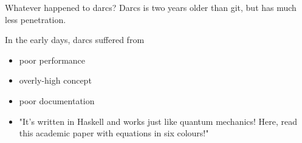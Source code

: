 \documentclass[pdf]{prosper}
\begin{document}

\begin{slide}{Whatever happened to darcs?}
Darcs is two years older than git, but has much less penetration.

In the early days, darcs suffered from
\begin{itemize}
\item poor performance
\item overly-high concept
\item poor documentation
\item "It's written in Haskell and works just like quantum mechanics! Here,
read this academic paper with equations in six colours!"
\end{itemize}
\end{slide}

\end{document}

